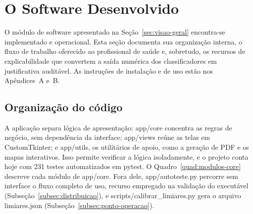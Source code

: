 \documentclass[
    12pt
    ,oneside
    ,a4paper
    ,chapter=TITLE
    ,section=TITLE
    ,sumario=abnt-6027-2012
    ,english,brazil]{abntex2} %
\begin{document}
\section{O Software Desenvolvido}
\label{sec:software}

O módulo de software apresentado na Seção~\ref{sec:visao-geral} encontra-se
implementado e operacional. Esta seção documenta sua organização interna, o
fluxo de trabalho oferecido ao profissional de saúde e, sobretudo, os recursos
de explicabilidade que convertem a saída numérica dos classificadores em
justificativa auditável. As instruções de instalação e de uso estão nos
Apêndices~A e~B.

\subsection{Organização do código}
\label{subsec:organizacao-codigo}

A aplicação separa lógica de apresentação: app/core concentra as regras de
negócio, sem dependência da interface; app/views reúne as telas em
CustomTkinter; e app/utils, os utilitários de apoio, como a geração de PDF e os
mapas interativos. Isso permite verificar a lógica isoladamente, e o projeto
conta hoje com 231 testes automatizados em pytest. O
Quadro~\ref{quad:modulos-core} descreve cada módulo de app/core. Fora dele,
app/autoteste.py percorre sem interface o fluxo completo de uso, recurso
empregado na validação do executável (Subseção~\ref{subsec:distribuicao}), e
scripts/calibrar\_limiares.py gera o arquivo limiares.json
(Subseção~\ref{subsec:ponto-operacao}).
\end{document}
